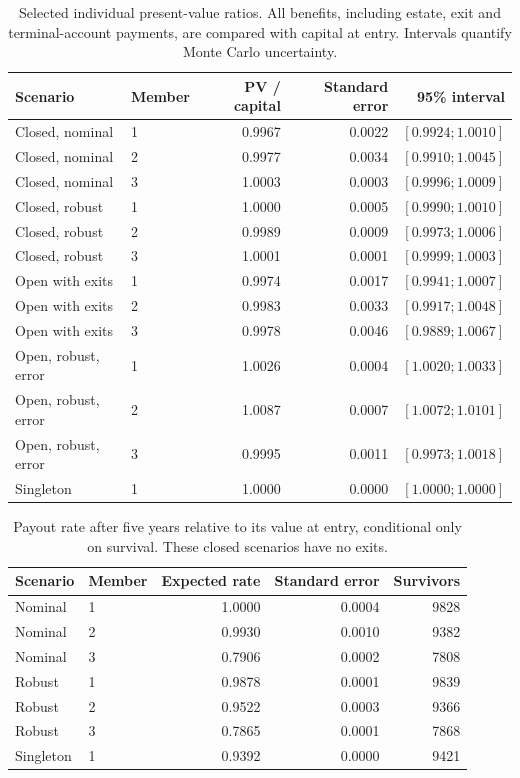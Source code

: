 \begin{table}[htbp]\centering\small
\caption{Selected individual present-value ratios. All benefits, including estate, exit and terminal-account payments, are compared with capital at entry. Intervals quantify Monte Carlo uncertainty.}
\begin{tabular}{llrrr}\toprule
Scenario & Member & PV / capital & Standard error & 95\% interval\\\midrule
Closed, nominal & 1 & 0.9967 & 0.0022 & $[0.9924;1.0010]$\\
Closed, nominal & 2 & 0.9977 & 0.0034 & $[0.9910;1.0045]$\\
Closed, nominal & 3 & 1.0003 & 0.0003 & $[0.9996;1.0009]$\\
Closed, robust & 1 & 1.0000 & 0.0005 & $[0.9990;1.0010]$\\
Closed, robust & 2 & 0.9989 & 0.0009 & $[0.9973;1.0006]$\\
Closed, robust & 3 & 1.0001 & 0.0001 & $[0.9999;1.0003]$\\
Open with exits & 1 & 0.9974 & 0.0017 & $[0.9941;1.0007]$\\
Open with exits & 2 & 0.9983 & 0.0033 & $[0.9917;1.0048]$\\
Open with exits & 3 & 0.9978 & 0.0046 & $[0.9889;1.0067]$\\
Open, robust, error & 1 & 1.0026 & 0.0004 & $[1.0020;1.0033]$\\
Open, robust, error & 2 & 1.0087 & 0.0007 & $[1.0072;1.0101]$\\
Open, robust, error & 3 & 0.9995 & 0.0011 & $[0.9973;1.0018]$\\
Singleton & 1 & 1.0000 & 0.0000 & $[1.0000;1.0000]$\\
\bottomrule\end{tabular}\end{table}
\begin{table}[htbp]\centering\small
\caption{Payout rate after five years relative to its value at entry, conditional only on survival. These closed scenarios have no exits.}
\begin{tabular}{llrrr}\toprule
Scenario & Member & Expected rate & Standard error & Survivors\\\midrule
Nominal & 1 & 1.0000 & 0.0004 & 9828\\
Nominal & 2 & 0.9930 & 0.0010 & 9382\\
Nominal & 3 & 0.7906 & 0.0002 & 7808\\
Robust & 1 & 0.9878 & 0.0001 & 9839\\
Robust & 2 & 0.9522 & 0.0003 & 9366\\
Robust & 3 & 0.7865 & 0.0001 & 7868\\
Singleton & 1 & 0.9392 & 0.0000 & 9421\\
\bottomrule\end{tabular}\end{table}
